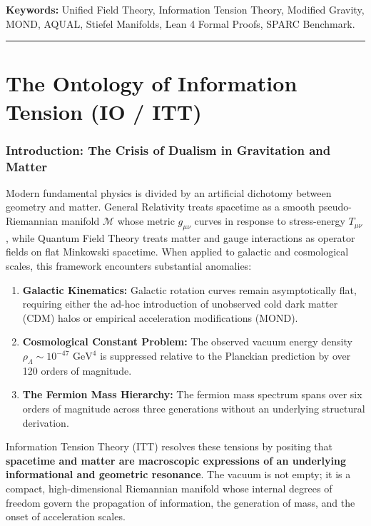 \documentclass[11pt,a4paper]{article}
\theoremstyle{plain}
\theoremstyle{definition}
\theoremstyle{remark}
\begin{document}
\vspace{1em}
\noindent \textbf{Keywords:} Unified Field Theory, Information Tension Theory, Modified Gravity, MOND, AQUAL, Stiefel Manifolds, Lean 4 Formal Proofs, SPARC Benchmark.

\vspace{1.5em}
\hrule
\vspace{1.5em}

\tableofcontents
\newpage

\part{The Ontology of Information Tension (IO / ITT)}

\section{Introduction: The Crisis of Dualism in Gravitation and Matter}

Modern fundamental physics is divided by an artificial dichotomy between geometry and matter. General Relativity treats spacetime as a smooth pseudo-Riemannian manifold $\mathcal{M}$ whose metric $g_{\mu\nu}$ curves in response to stress-energy $T_{\mu\nu}$, while Quantum Field Theory treats matter and gauge interactions as operator fields on flat Minkowski spacetime. When applied to galactic and cosmological scales, this framework encounters substantial anomalies:
\begin{enumerate}[label=(\roman*)]
    \item \textbf{Galactic Kinematics:} Galactic rotation curves remain asymptotically flat, requiring either the ad-hoc introduction of unobserved cold dark matter (CDM) halos or empirical acceleration modifications (MOND).
    \item \textbf{Cosmological Constant Problem:} The observed vacuum energy density $\rho_\Lambda \sim 10^{-47}\text{ GeV}^4$ is suppressed relative to the Planckian prediction by over 120 orders of magnitude.
    \item \textbf{The Fermion Mass Hierarchy:} The fermion mass spectrum spans over six orders of magnitude across three generations without an underlying structural derivation.
\end{enumerate}

Information Tension Theory (ITT) resolves these tensions by positing that \textbf{spacetime and matter are macroscopic expressions of an underlying informational and geometric resonance}. The vacuum is not empty; it is a compact, high-dimensional Riemannian manifold whose internal degrees of freedom govern the propagation of information, the generation of mass, and the onset of acceleration scales.
\end{document}
